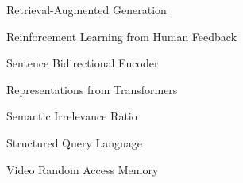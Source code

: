 \documentclass[12pt, onehalfspacing, liststotoc, oneside, parskip, headsepline]{UMaT_Undergrauate_Report_Template_Configurations} %
\begin{document}
\begin{description}[style=nextline,leftmargin=4.5cm,labelwidth=4cm,font=\normalfont,itemsep=-1.5ex]
  \item[RAG]\hspace{0.1\textwidth} Retrieval-Augmented Generation
  \item[RLHF]\hspace{0.1\textwidth} Reinforcement Learning from Human Feedback
  \item[SBERT]\hspace{0.1\textwidth} Sentence Bidirectional Encoder
  \item[] \hspace{0.1\textwidth} Representations from Transformers
  \item[SIR]\hspace{0.1\textwidth} Semantic Irrelevance Ratio
  \item[SQL]\hspace{0.1\textwidth} Structured Query Language
  \item[VRAM]\hspace{0.1\textwidth} Video Random Access Memory

\end{description}







%
%
%


%
%
%
%
\end{document}
